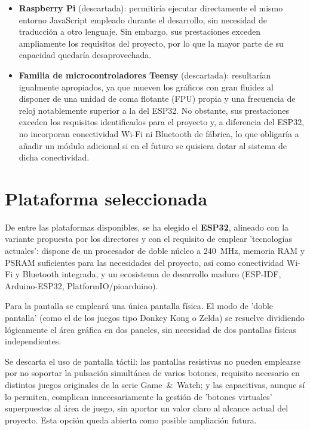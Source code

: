 \documentclass[../main.tex]{subfiles}
\begin{document}
\begin{itemize}
		\item \textbf{Raspberry Pi} (descartada): permitiría ejecutar directamente el mismo entorno JavaScript empleado durante el desarrollo, sin necesidad de traducción a otro lenguaje. Sin embargo, sus prestaciones exceden ampliamente los requisitos del proyecto, por lo que la mayor parte de su capacidad quedaría desaprovechada.

		\item \textbf{Familia de microcontroladores Teensy} (descartada): resultarían igualmente apropiados, ya que mueven los gráficos con gran fluidez al disponer de una unidad de coma flotante (FPU) propia y una frecuencia de reloj notablemente superior a la del ESP32. No obstante, sus prestaciones exceden los requisitos identificados para el proyecto y, a diferencia del ESP32, no incorporan conectividad Wi-Fi ni Bluetooth de fábrica, lo que obligaría a añadir un módulo adicional si en el futuro se quisiera dotar al sistema de dicha conectividad.
	\end{itemize}

	\section{Plataforma seleccionada}
	\label{sec:plataforma-seleccionada}

	De entre las plataformas disponibles, se ha elegido el \textbf{ESP32}, alineado con la variante propuesta por los directores y con el requisito de emplear 'tecnologías actuales': dispone de un procesador de doble núcleo a 240~MHz, memoria RAM y PSRAM suficientes para las necesidades del proyecto, así como conectividad Wi-Fi y Bluetooth integrada, y un ecosistema de desarrollo maduro (ESP-IDF, Arduino-ESP32, PlatformIO/pioarduino).

	Para la pantalla se empleará una única pantalla física. El modo de 'doble pantalla' (como el de los juegos tipo Donkey Kong o Zelda) se resuelve dividiendo lógicamente el área gráfica en dos paneles, sin necesidad de dos pantallas físicas independientes.

	Se descarta el uso de pantalla táctil: las pantallas resistivas no pueden emplearse por no soportar la pulsación simultánea de varios botones, requisito necesario en distintos juegos originales de la serie Game~\&~Watch; y las capacitivas, aunque sí lo permiten, complican innecesariamente la gestión de 'botones virtuales' superpuestos al área de juego, sin aportar un valor claro al alcance actual del proyecto. Esta opción queda abierta como posible ampliación futura.
\end{document}
